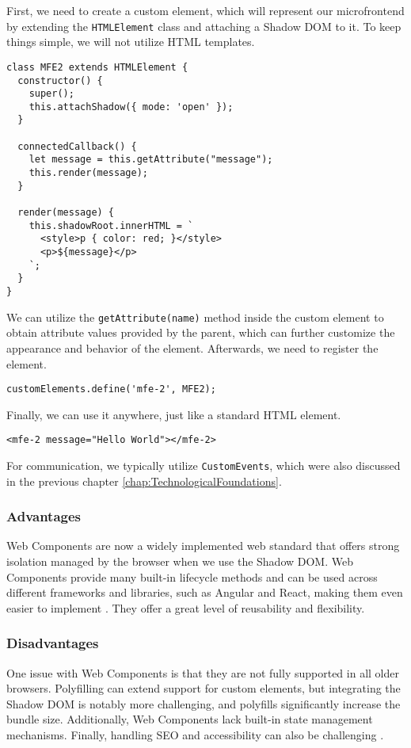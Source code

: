\noindent
First, we need to create a custom element, which will represent our microfrontend by extending the \texttt{HTMLElement} class and attaching a Shadow DOM to it. To keep things simple, we will not utilize HTML templates.  
\begin{verbatim}
class MFE2 extends HTMLElement {
  constructor() {
    super();
    this.attachShadow({ mode: 'open' });
  }
    
  connectedCallback() {
    let message = this.getAttribute("message");
    this.render(message);
  }
    
  render(message) {
    this.shadowRoot.innerHTML = `
      <style>p { color: red; }</style>
      <p>${message}</p>
    `;
  }
}
\end{verbatim}
We can utilize the \texttt{getAttribute(name)} method inside the custom element to obtain attribute values provided by the parent, which can further customize the appearance and behavior of the element. Afterwards, we need to register the element.
\begin{verbatim}
customElements.define('mfe-2', MFE2);
\end{verbatim}
Finally, we can use it anywhere, just like a standard HTML element.
\begin{verbatim}
<mfe-2 message="Hello World"></mfe-2>
\end{verbatim}
For communication, we typically utilize \texttt{CustomEvents}, which were also discussed in the previous chapter \ref{chap:TechnologicalFoundations}.

\subsubsection{Advantages}
Web Components are now a widely implemented web standard that offers strong isolation managed by the browser when we use the Shadow DOM. Web Components provide many built-in lifecycle methods and can be used across different frameworks and libraries, such as Angular and React, making them even easier to implement \cite{Geers}. They offer a great level of reusability and flexibility.

\subsubsection{Disadvantages}
One issue with Web Components is that they are not fully supported in all older browsers. Polyfilling can extend support for custom elements, but integrating the Shadow DOM is notably more challenging, and polyfills significantly increase the bundle size. Additionally, Web Components lack built-in state management mechanisms. Finally, handling SEO and accessibility can also be challenging \cite{Geers}\cite{MezzaliraBuildingMf}.

